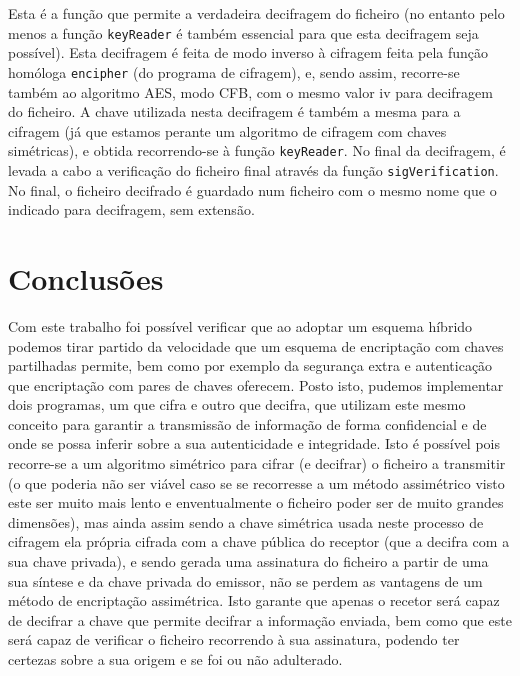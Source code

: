 \documentclass[a4paper,11pt,openright,oneside]{report}
\begin{document}
Esta é a função que permite a verdadeira decifragem do ficheiro (no entanto pelo menos a função \verb|keyReader| é também essencial para que esta decifragem seja possível). Esta decifragem é feita de modo inverso à cifragem feita pela função homóloga \verb|encipher| (do programa de cifragem), e, sendo assim, recorre-se também ao algoritmo AES, modo CFB, com o mesmo valor iv para decifragem do ficheiro. A chave utilizada nesta decifragem é também a mesma para a cifragem (já que estamos perante um algoritmo de cifragem com chaves simétricas), e obtida recorrendo-se à função \verb|keyReader|. No final da decifragem, é levada a cabo a verificação do ficheiro final através da função \verb|sigVerification|.\\

No final, o ficheiro decifrado é guardado num ficheiro com o mesmo nome que o indicado para decifragem, sem extensão.

\chapter{Conclusões}
\label{chap.conclusões}

Com este trabalho foi possível verificar que ao adoptar um esquema híbrido podemos tirar partido da velocidade que um esquema de encriptação com chaves partilhadas permite, bem como por exemplo da segurança extra e autenticação que encriptação com pares de chaves oferecem. Posto isto, pudemos implementar dois programas, um que cifra e outro que decifra, que utilizam este mesmo conceito para garantir a transmissão de informação de forma confidencial e de onde se possa inferir sobre a sua autenticidade e integridade. Isto é possível pois recorre-se a um algoritmo simétrico para cifrar (e decifrar) o ficheiro a transmitir (o que poderia não ser viável caso se se recorresse a um método assimétrico visto este ser muito mais lento e enventualmente o ficheiro poder ser de muito grandes dimensões), mas ainda assim sendo a chave simétrica usada neste processo de cifragem ela própria cifrada com a chave pública do receptor (que a decifra com a sua chave privada), e sendo gerada uma assinatura do ficheiro a partir de uma sua síntese e da chave privada do emissor, não se perdem as vantagens de um método de encriptação assimétrica. Isto garante que apenas o recetor será capaz de decifrar a chave que permite decifrar a informação enviada, bem como que este será capaz de verificar o ficheiro recorrendo à sua assinatura, podendo ter certezas sobre a sua origem e se foi ou não adulterado.
\end{document}
